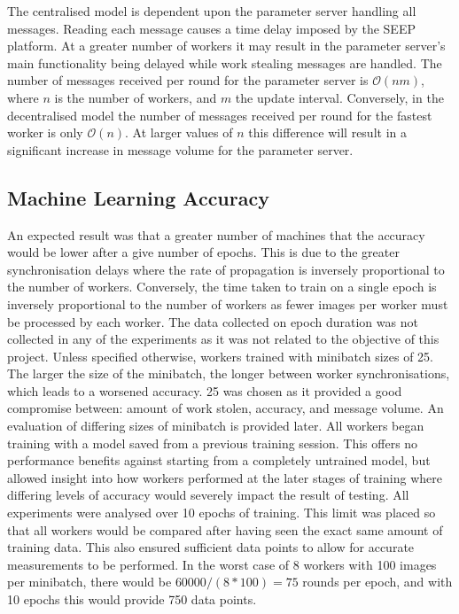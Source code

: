 \documentclass[12pt]{article}
\begin{document}
\newline
\newline
The centralised model is dependent upon the parameter server handling all messages. Reading each message causes a time delay imposed by the SEEP platform. At a greater number of workers it may result in the parameter server's main functionality being delayed while work stealing messages are handled. The number of messages received per round for the parameter server is $\mathcal{O}(nm)$, where $n$ is the number of workers, and $m$ the update interval. Conversely, in the decentralised model the number of messages received per round for the fastest worker is only $\mathcal{O}(n)$. At larger values of $n$ this difference will result in a significant increase in message volume for the parameter server.

\subsection{Machine Learning Accuracy}
An expected result was that a greater number of machines that the accuracy would be lower after a give number of epochs. This is due to the greater synchronisation delays where the rate of propagation is inversely proportional to the number of workers. Conversely, the time taken to train on a single epoch is inversely proportional to the number of workers as fewer images per worker must be processed by each worker. The data collected on epoch duration was not collected in any of the experiments as it was not related to the objective of this project.
\newline
\newline
Unless specified otherwise, workers trained with minibatch sizes of 25. The larger the size of the minibatch, the longer between worker synchronisations, which leads to a worsened accuracy. 25 was chosen as it provided a good compromise between: amount of work stolen, accuracy, and message volume. An evaluation of differing sizes of minibatch is provided later.
\newline
\newline
All workers began training with a model saved from a previous training session. This offers no performance benefits against starting from a completely untrained model, but allowed insight into how workers performed at the later stages of training where differing levels of accuracy would severely impact the result of testing.
\newline
\newline
All experiments were analysed over 10 epochs of training. This limit was placed so that all workers would be compared after having seen the exact same amount of training data. This also ensured sufficient data points to allow for accurate measurements to be performed. In the worst case of 8 workers with 100 images per minibatch, there would be $60000/(8*100) = 75$ rounds per epoch, and with 10 epochs this would provide 750 data points.
\end{document}
